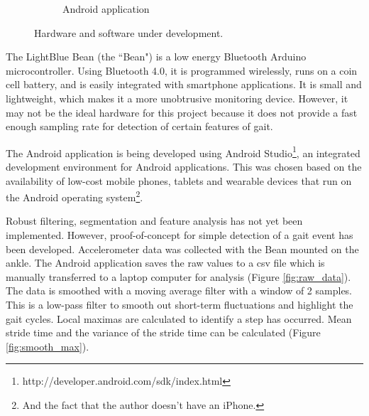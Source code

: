 \documentclass[11pt, oneside]{report}
\begin{document}
\begin{figure}[h]
\begin{subfigure}[b]{0.3\textwidth}
        \caption{Android application}
        \label{fig:app_screenshot}
    \end{subfigure}
        \caption{Hardware and software under development.}\label{fig:progress}
\end{figure}

The LightBlue Bean (the ``Bean") is a low energy Bluetooth Arduino microcontroller. Using Bluetooth 4.0, it is programmed wirelessly, runs on a coin cell battery, and is easily integrated with smartphone applications. It is small and lightweight, which makes it a more unobtrusive monitoring device. However, it may not be the ideal hardware for this project because it does not provide a fast enough sampling rate for detection of certain features of gait.

The Android application is being developed using Android Studio\footnote{http://developer.android.com/sdk/index.html}, an integrated development environment for Android applications. This was chosen based on the availability of low-cost mobile phones, tablets and wearable devices that run on the Android operating system\footnote{And the fact that the author doesn't have an iPhone.}.

Robust filtering, segmentation and feature analysis has not yet been implemented. However, proof-of-concept for simple detection of a gait event has been developed. Accelerometer data was collected with the Bean mounted on the ankle. The Android application saves the raw values to a csv file which is manually transferred to a laptop computer for analysis (Figure \ref{fig:raw_data}). The data is smoothed with a moving average filter with a window of 2 samples. This is a low-pass filter to smooth out short-term fluctuations and highlight the gait cycles. Local maximas are calculated to identify a step has occurred. Mean stride time and the variance of the stride time can be calculated (Figure \ref{fig:smooth_max}).
\end{document}
